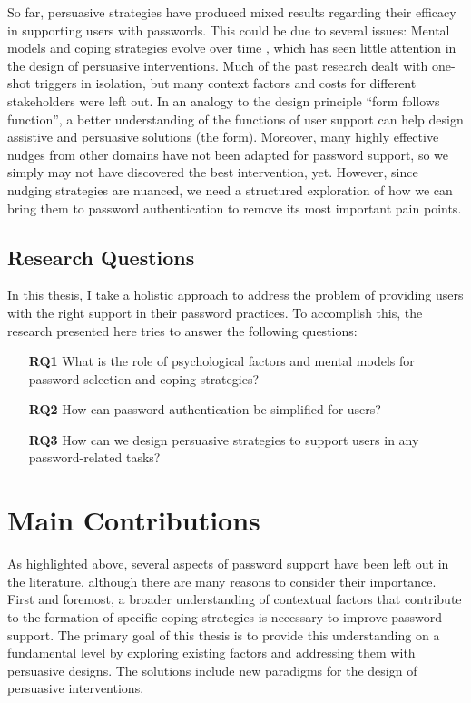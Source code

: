 So far, persuasive strategies have produced mixed results regarding their efficacy in supporting users with passwords. This could be due to several issues: Mental models and coping strategies evolve over time \cite{Stobert2014PasswordLifeCycle, Volkamer2013MentalModels}, which has seen little attention in the design of persuasive interventions. Much of the past research dealt with one-shot triggers in isolation, but many context factors and costs for different stakeholders were left out. In an analogy to the design principle ``form follows function'', a better understanding of the functions of user support can help design assistive and persuasive solutions (the form). Moreover, many highly effective nudges from other domains have not been adapted for password support, so we simply may not have discovered the best intervention, yet. However, since nudging strategies are nuanced, we need a structured exploration of how we can bring them to password authentication to remove its most important pain points.

\subsection{Research Questions}
In this thesis, I take a holistic approach to address the problem of providing users with the right support in their password practices. To accomplish this, the research presented here tries to answer the following questions:
\begin{itemize}
	\item[\textbf{RQ1}] What is the role of psychological factors and mental models for password selection and coping strategies?
	\item[\textbf{RQ2}] How can password authentication be simplified for users? 
	\item[\textbf{RQ3}] How can we design persuasive strategies to support users in any password-related tasks?
\end{itemize}

\section{Main Contributions}
As highlighted above, several aspects of password support have been left out in the literature, although there are many reasons to consider their importance. First and foremost, a broader understanding of contextual factors that contribute to the formation of specific coping strategies is necessary to improve password support. The primary goal of this thesis is to provide this understanding on a fundamental level by exploring existing factors and addressing them with persuasive designs. The solutions include new paradigms for the design of persuasive interventions.
